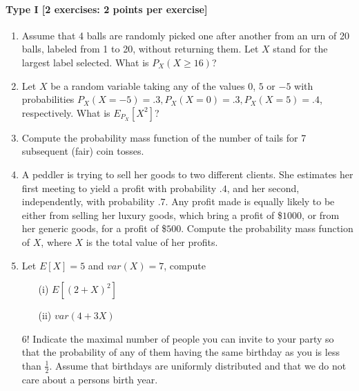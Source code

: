 \documentclass{article}
\begin{document}
\paragraph{Type I [2 exercises: 2 points per exercise]}
\begin{enumerate}
	\item Assume that 4 balls are randomly picked one after another from an urn of 20 balls, labeled from 1 to 20, without returning them. Let $X$ stand for the largest label selected. What is $P_X(X \geq 16)$?
	\item Let $X$ be a random variable taking any of the values $0$, $5$ or $-5$ with probabilities $P_X(X = -5) = .3, P_X(X = 0) = .3, P_X(X = 5) = .4$, respectively. What is $E_{P_X}[X^2]$?
	\item Compute the probability mass function of the number of tails for 7 subsequent (fair) coin tosses. 
	\item A peddler is trying to sell her goods to two different clients. She estimates her first meeting to yield a profit with probability $.4$, and her second, independently, with probability $.7$. Any profit made is equally likely to be either from selling her luxury goods, which bring a profit of \$$1000$, or from her generic goods, for a profit of \$$500$. Compute the probability mass function of $X$, where $X$ is the total value of her profits.
	\item Let $E[X] = 5$ and $var(X) = 7$, compute
		\begin{itemize}
			\item[(i)] $E[(2 + X)^2]$
			\item[(ii)] $var(4 + 3X)$
		\end{itemize}
	\item[6!] Indicate the maximal number of people you can invite to your party so that the probability of any of them having the same birthday as you is less than $\frac{1}{2}$. Assume that birthdays are uniformly distributed and that we do not care about a persons birth year. 
\end{enumerate}
\end{document}
